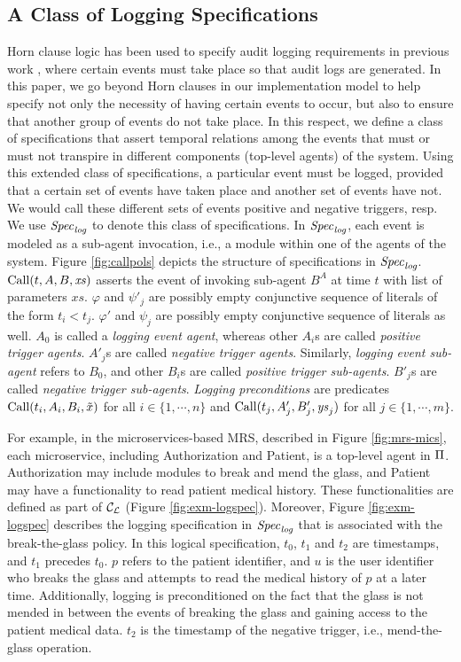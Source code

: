 \subsection{A Class of Logging Specifications} \label{sec:logspec}
Horn clause logic has been used to specify audit logging requirements in previous work \cite{stpsa21}, where certain events must take place so that audit logs are generated. In this paper, we go beyond Horn clauses in our implementation model to help specify not only the necessity of having certain events to occur, but also to ensure that another group of events do not take place. In this respect, we define a class of specifications that assert temporal relations among the events that must or must not transpire in different components (top-level agents) of the system. Using this extended class of specifications, a particular event must be logged, provided that a certain set of events have taken place and another set of events have not. We would call these different sets of events positive and negative triggers, resp. We use ${\mathit{Spec}_{\mathit{log}}}$ to denote this class of specifications. In ${\mathit{Spec}_{\mathit{log}}}$, each event is modeled as a sub-agent invocation, i.e., a module within one of the agents of the system. Figure \ref{fig:callpols} depicts the structure of specifications in ${\mathit{Spec}_{\mathit{log}}}$. $\mathrm{Call}(t,A,B,\mathit{xs})$ asserts the event of invoking sub-agent $B^A$ at time $t$ with list of parameters $\mathit{xs}$. $\varphi$ and $\psi'_j$ are possibly empty conjunctive sequence of literals of the form $t_i < t_j$. $\varphi'$ and $\psi_j$ are possibly empty conjunctive sequence of literals as well. $A_0$ is called a \emph{logging event agent}, whereas other $A_i$s are called \emph{positive trigger agents}. $A'_j$s are called \emph{negative trigger agents}. Similarly, \emph{logging event sub-agent} refers to $B_0$, and other $B_i$s are called \emph{positive trigger sub-agents}. $B'_j$s are called \emph{negative trigger sub-agents}. \emph{Logging preconditions} are predicates $\mathrm{Call}(t_i,A_i,B_i,\tilde{x})$ for all $i \in \{1,\cdots, n\}$ and $\mathrm{Call}(t_j , A'_j , B'_j , \mathit{ys}_j )$ for all $j \in \{1, \cdots, m\}$. 

For example, in the microservices-based MRS, described in Figure \ref{fig:mrs-mics}, each microservice, including Authorization and Patient, is a top-level agent in $\Pi$. Authorization may include modules to break and mend the glass, and Patient may have a functionality to read patient medical history. These functionalities are defined as part of $\mathcal{C}_\mathcal{L}$ (Figure \ref{fig:exm-logspec}). Moreover, Figure \ref{fig:exm-logspec} describes the logging specification in ${\mathit{Spec}_{\mathit{log}}}$ that is associated with the break-the-glass policy. In this logical specification, $t_0$, $t_1$ and $t_2$ are timestamps, and $t_1$ precedes $t_0$.  $p$ refers to the patient identifier, and $u$ is the user identifier who breaks the glass and attempts to read the medical history of $p$ at a later time. Additionally, logging is preconditioned on the fact that the glass is not mended in between the events of breaking the glass and gaining access to the patient medical data. $t_2$ is the timestamp of the negative trigger, i.e., mend-the-glass operation.


